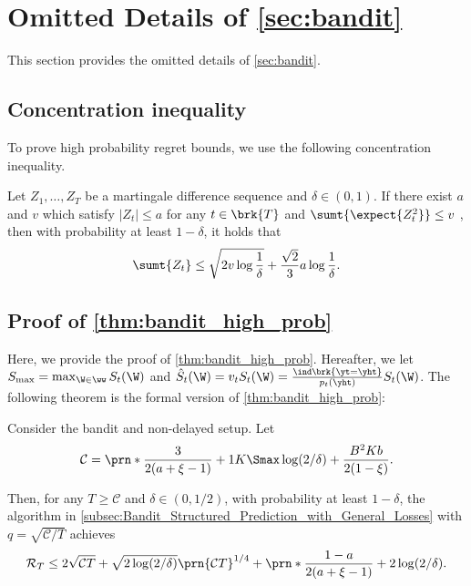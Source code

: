\section{Omitted Details of \cref{sec:bandit}}
\label{app:proof bandit}
This section provides the omitted details of \cref{sec:bandit}.

\subsection{Concentration inequality}
To prove high probability regret bounds, we use the following concentration inequality.
\begin{lemma}
    \label{lem:Bernstein}
    Let $Z_1,\hdots,Z_T$ be a martingale difference sequence and $\delta \in (0,1)$.
    If there exist $a$ and $v$ which satisfy $|Z_t|\leq a$ for any $t \in \brk{T}$ and $\sumt{\expect{Z_t^2}}\leq v$ , then with probability at least $1-\delta$, it holds that
    \[
        \sumt{Z_t}\leq\sqrt{2v\log\frac{1}{\delta}}+\frac{\sqrt{2}}{3}a\log\frac{1}{\delta}.
    \]
\end{lemma}


\subsection{Proof of \cref{thm:bandit_high_prob}}\label{app:proof_bandit_high_prob}
Here, we provide the proof of \cref{thm:bandit_high_prob}.
Hereafter, we let $S_{\max} = \max_{\W \in \ww} S_t(\W)$ and $\hat{S}_t(\W) = v_t S_t(\W) = \frac{\ind\brk{\yt = \yht}}{p_t(\yht)} S_t(\W)$.
The following theorem is the formal version of \cref{thm:bandit_high_prob}:
\begin{theorem}\label{thm:bandit_high_prob_formal}
Consider the bandit and non-delayed setup.
Let 
\begin{equation}
    \mathcal{C}
    =
    \prn*{
        \frac{3}{2 (a + \xi - 1)}  
        +
        1
    }
    K \Smax \log(2/\delta) 
    +
    \frac{B^2 K b}{2 (1 - \xi)}
    .
    \nonumber
\end{equation}

Then, for any $T \geq \mathcal{C}$ and $\delta \in (0,1/2)$, with probability at least $1-\delta$, the algorithm in \cref{subsec:Bandit_Structured_Prediction_with_General_Losses} with $q = \sqrt{\mathcal{C} / T}$ achieves
\begin{equation}
    \mathcal{R}_T
    \leq
    2
    \sqrt{
        \mathcal{C}
        T
    }
    +
    \sqrt{2 \log (2/ \delta)} \prn{\mathcal{C} T}^{1/4}
    +
    \prn*{ \frac{1-a}{2 (a + \xi - 1)} + 2 } \log (2/\delta).
    \nonumber
\end{equation}
\end{theorem}


